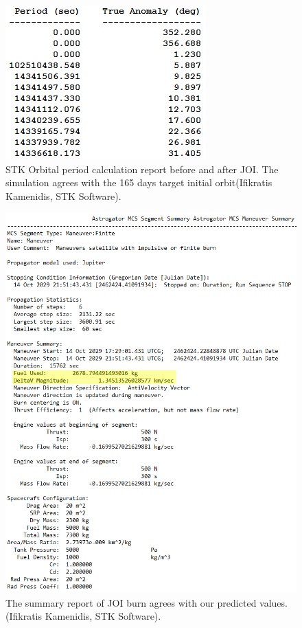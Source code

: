 \begin{figure}[htb!]
\centering
\includegraphics[scale=0.5]{figures/Orbiter/captorb.png}
\caption{STK Orbital period calculation report before and after JOI. The simulation agrees with the 165 days target initial orbit(Ifikratis Kamenidis, STK Software).}
\label{fig:stk_report1}
\end{figure}
\begin{figure}[htb!]
\centering
\includegraphics[scale=0.5]{figures/Orbiter/JOIres.png}
\caption{The summary report of JOI burn agrees with our predicted values.(Ifikratis Kamenidis, STK Software).}
\label{fig:stk_report2}
\end{figure}
